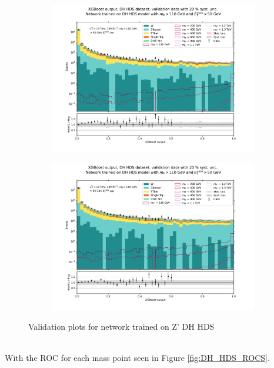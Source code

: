\documentclass[12pt, a4paper]{book}
\begin{document}
\begin{figure}[!ht]
	\centering
	\begin{subfigure}[b]{0.49\textwidth}
      \centering
      \includegraphics[width=1\textwidth]{XGBoost/DH_HDS/VAL_ee.pdf}
      \end{subfigure}
   \hfill
   \begin{subfigure}[b]{0.49\textwidth}
      \centering
      \includegraphics[width=1\textwidth]{XGBoost/DH_HDS/VAL_uu.pdf}
      \end{subfigure}
   \caption{Validation plots for network trained on Z' DH HDS}\label{fig:DH_HDS_vals}
\end{figure}
\\With the ROC for each mass point seen in Figure \ref{fig:DH_HDS_ROCS}.
\end{document}
